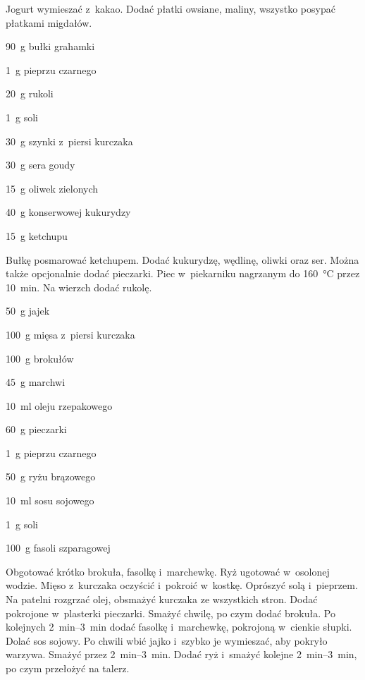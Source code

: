 \documentclass[../kucharek.tex]{subfiles}
\begin{document}
Jogurt wymieszać z~kakao. Dodać płatki owsiane, maliny, wszystko posypać
płatkami migdałów.


\begin{Ingred}
    \item \qty{90}{\gram} bułki grahamki
    \item \qty{1}{\gram} pieprzu czarnego
    \item \qty{20}{\gram} rukoli
    \item \qty{1}{\gram} soli
    \item \qty{30}{\gram} szynki z~piersi kurczaka
    \item \qty{30}{\gram} sera goudy
    \item \qty{15}{\gram} oliwek zielonych
    \item \qty{40}{\gram} konserwowej kukurydzy
    \item \qty{15}{\gram} ketchupu
\end{Ingred}

Bułkę posmarować ketchupem. Dodać kukurydzę, wędlinę, oliwki oraz ser. Można
także opcjonalnie dodać pieczarki. Piec w~piekarniku nagrzanym do
\qty{160}{\celsius} przez \qty{10}{\minute}. Na wierzch dodać rukolę.


\begin{Ingred}
    \item \qty{50}{\gram} jajek
    \item \qty{100}{\gram} mięsa z~piersi kurczaka
    \item \qty{100}{\gram} brokułów
    \item \qty{45}{\gram} marchwi
    \item \qty{10}{\milli\litre} oleju rzepakowego
    \item \qty{60}{\gram} pieczarki
    \item \qty{1}{\gram} pieprzu czarnego
    \item \qty{50}{\gram} ryżu brązowego
    \item \qty{10}{\milli\litre} sosu sojowego
    \item \qty{1}{\gram} soli
    \item \qty{100}{\gram} fasoli szparagowej
\end{Ingred}

Obgotować krótko brokuła, fasolkę i~marchewkę. Ryż ugotować w~osolonej wodzie.
Mięso z~kurczaka oczyścić i~pokroić w~kostkę. Oprószyć solą i~pieprzem. Na
patelni rozgrzać olej, obsmażyć kurczaka ze wszystkich stron. Dodać pokrojone
w~plasterki pieczarki. Smażyć chwilę, po czym dodać brokuła. Po kolejnych
\qtyrange{2}{3}{\minute} dodać fasolkę i~marchewkę, pokrojoną w~cienkie słupki.
Dolać sos sojowy. Po chwili wbić jajko i~szybko je wymieszać, aby pokryło
warzywa. Smażyć przez \qtyrange{2}{3}{\minute}. Dodać ryż i~smażyć kolejne
\qtyrange{2}{3}{\minute}, po czym przełożyć na talerz.
\end{document}
